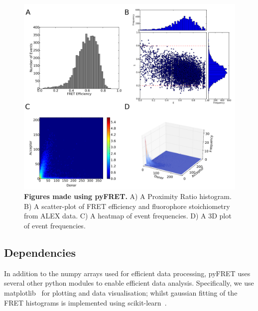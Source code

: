 \begin{figure}[!ht]
   \begin{center}
      \includegraphics*[clip=true, width=6in]{pyFRET/6bp_example.pdf}
      \caption{{\bf Figures made using pyFRET.} A) A Proximity Ratio histogram. B) A scatter-plot of FRET efficiency and fluorophore stoichiometry from ALEX data. C) A heatmap of event frequencies.  D) A 3D plot of event frequencies.}
      \label{fig:fig3_sample_results}
   \end{center}
\end{figure}

\subsection{Dependencies}
In addition to the numpy arrays used for efficient data processing, pyFRET uses several other python modules to enable efficient data analysis. Specifically, we use matplotlib~\cite{Hunter2007} for plotting and data visualisation; whilst gaussian fitting of the FRET histograms is implemented using scikit-learn~\cite{scikit-learn}. 


